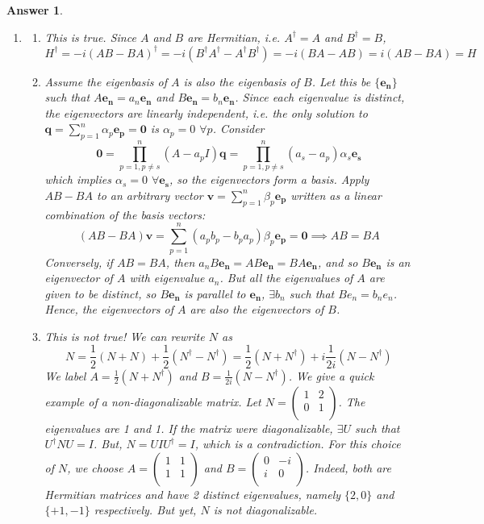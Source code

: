 \documentclass[a4paper]{article}
\newtheorem{ans}{Answer}[section]
\theoremstyle{new}
\begin{document}
\begin{ans}\leavevmode
\begin{enumerate}[label=(\alph*)]
\item 
\begin{enumerate}[label=(\roman*)]
\item This is true. Since $A$ and $B$ are Hermitian, i.e. $A^\dag=A$ and $B^\dag=B$, 
$$H^\dag=-i(AB-BA)^\dag=-i(B^\dag A^\dag-A^\dag B^\dag)=-i(BA-AB)=i(AB-BA)=H$$
\item Assume the eigenbasis of $A$ is also the eigenbasis of $B$. Let this be $\{\mathbf{e_n}\}$ such that $A\mathbf{e_n}=a_n\mathbf{e_n}$ and $B\mathbf{e_n}=b_n\mathbf{e_n}$. Since each eigenvalue is distinct, the eigenvectors are linearly independent, i.e. the only solution to $\mathbf{q}=\sum_{p=1}^n\alpha_p\mathbf{e_p}=\boldsymbol{0}$ is $\alpha_p=0$ $\forall p$. Consider
$$\boldsymbol{0}=\prod_{p=1,p\neq s}^n(A-a_pI)\mathbf{q}=\prod_{p=1,p\neq s}^n(a_s-a_p)\alpha_s\mathbf{e_s}$$
which implies $\alpha_s=0$ $\forall\mathbf{e_s}$, so the eigenvectors form a basis. Apply $AB-BA$ to an arbitrary vector $\mathbf{v}=\sum_{p=1}^n\beta_p\mathbf{e_p}$ written as a linear combination of the basis vectors:
$$(AB-BA)\mathbf{v}=\sum_{p=1}^n(a_pb_p-b_pa_p)\beta_p\mathbf{e_p}=\boldsymbol{0}\implies AB=BA$$
Conversely, if $AB=BA$, then $a_nB\mathbf{e_n}=AB\mathbf{e_n}=BA\mathbf{e_n}$, and so $B\mathbf{e_n}$ is an eigenvector of $A$ with eigenvalue $a_n$. But all the eigenvalues of $A$ are given to be distinct, so $B\mathbf{e_n}$ is parallel to $\mathbf{e_n}$, $\exists b_n$ such that $Be_n=b_ne_n$. Hence, the eigenvectors of $A$ are also the eigenvectors of $B$.
\item This is not true! We can rewrite $N$ as
$$N=\frac{1}{2}(N+N)+\frac{1}{2}(N^\dag-N^\dag)=\frac{1}{2}(N+N^\dag)+i\frac{1}{2i}(N-N^\dag)$$
We label $A=\frac{1}{2}(N+N^\dag)$ and $B=\frac{1}{2i}(N-N^\dag)$. We give a quick example of a non-diagonalizable matrix. Let $N=\begin{pmatrix}1&2\\0&1\\\end{pmatrix}$. The eigenvalues are 1 and 1. If the matrix were diagonalizable, $\exists U$ such that $U^\dag NU=I$. But, $N=UIU^\dag=I$, which is a contradiction. For this choice of $N$, we choose $A=\begin{pmatrix}1&1\\1&1\\\end{pmatrix}$ and $B=\begin{pmatrix}0&-i\\i&0\\\end{pmatrix}$. Indeed, both are Hermitian matrices and have 2 distinct eigenvalues, namely $\{2,0\}$ and $\{+1,-1\}$ respectively. But yet, $N$ is not diagonalizable.

\end{enumerate}
\end{enumerate}
\end{ans}
\end{document}
